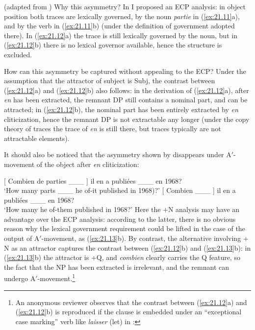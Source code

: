 \documentclass[output=paper]{langsci/langscibook}
\begin{document}
\begin{exe}
\ea%
    \label{ex:21.12} (adapted from \citealt{Ruwet1972})
    \z
\z
%
Why this asymmetry? In \citet[37--38]{Rizzi1990} I proposed an \gls{ECP}
analysis: in object position both traces are lexically governed, by the noun
\emph{partie} in (\ref{ex:21.11}a), and by the verb in (\ref{ex:21.11}b)
(under the definition of government adopted there). In (\ref{ex:21.12}a) the
trace is still lexically governed by the noun, but in (\ref{ex:21.12}b) there
is no lexical governor available, hence the structure is excluded.

How can this asymmetry be captured without appealing to the ECP? Under the
assumption that the attractor of subject is Subj\tss{[$+$N]}, the contrast
between (\ref{ex:21.12}a) and (\ref{ex:21.12}b) also follows: in the
derivation of (\ref{ex:21.12}a), after \emph{en} has been extracted, the
remnant DP still contains a nominal part, and can be attracted; in
(\ref{ex:21.12}b), the nominal part has been entirely extracted by
\emph{en} cliticization, hence the remnant DP is not extractable any longer
(under the copy theory of traces the trace of \emph{en} is still there, but
traces typically are not attractable elements).

It should also be noticed that the asymmetry shown by 
disappears under A$'$-movement of the object after \emph{en} cliticization:

\ea%
    \label{ex:21.13}
    \ea {}[ Combien de parties \_\_\_ ] il en a publiées \_\_\_ en 1968?\\
        ‘How many parts \_\_\_  he of-it published in 1968)?’
    \ex {}[ Combien \_\_\_ ]  il en a publiées \_\_\_ en 1968?\\
            ‘How many        he of-them published in 1968?’
    \z
\z
%
Here the $+$N analysis may have an advantage over the \gls{ECP} analysis:
according to the latter, there is no obvious reason why the lexical government
requirement could be lifted in the case of the output of A$'$-movement, as
(\ref{ex:21.13}b). By contrast, the alternative involving $+$N as an attractor
captures the contrast between (\ref{ex:21.12}b) and (\ref{ex:21.13}b): in
(\ref{ex:21.13}b) the attractor is +Q, and \emph{combien} clearly carries the
Q feature, so the fact that the NP has been extracted is irrelevant, and the
remnant can undergo A$'$-movement.\footnote{An anonymous reviewer observes that
    the contrast between (\ref{ex:21.12}a) and (\ref{ex:21.12}b) is
    reproduced if the clause is embedded under an “exceptional case marking”
    verb like \emph{laisser} (let) in :

}
\end{exe}
\end{document}
